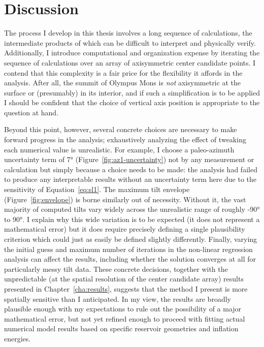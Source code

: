 \chapter{Discussion}\label{cha:discussion}

The process I develop in this thesis involves a long sequence of calculations, the intermediate products of which can be difficult to interpret and physically verify. Additionally, I introduce computational and organization expense by iterating the sequence of calculations over an array of axisymmetric center candidate points. I contend that this complexity is a fair price for the flexibility it affords in the analysis. After all, the summit of Olympus Mons is \emph{not} axisymmetric at the surface or (presumably) in its interior, and if such a simplification is to be applied I should be confident that the choice of vertical axis position is appropriate to the question at hand.

Beyond this point, however, several concrete choices are necessary to make forward progress in the analysis; exhaustively analyzing the effect of tweaking each numerical value is unrealistic. For example, I choose a paleo-azimuth uncertainty term of \ang{7} (Figure~\ref{fig:az1-uncertainty}) not by any measurement or calculation but simply because a choice needs to be made: the analysis had failed to produce any interpretable results without an uncertainty term here due to the sensitivity of Equation~\eqref{eq:sl1}. The maximum tilt envelope (Figure~\ref{fig:envelope}) is borne similarly out of necessity. Without it, the vast majority of computed tilts vary widely across the unrealistic range of roughly \ang{-90} to \ang{90}. I explain why this wide variation is to be expected (it does not represent a mathematical error) but it does require precisely defining a single plausibility criterion which could just as easily be defined slightly differently. Finally, varying the initial guess and maximum number of iterations in the non-linear regression analysis can affect the results, including whether the solution converges at all for particularly messy tilt data. These concrete decisions, together with the unpredictable (at the spatial resolution of the center candidate array) results presented in Chapter~\ref{cha:results}, suggests that the method I present is more spatially sensitive than I anticipated. In my view, the results are broadly plausible enough with my expectations to rule out the possibility of a major mathematical error, but not yet refined enough to proceed with fitting actual numerical model results based on specific reservoir geometries and inflation energies.

